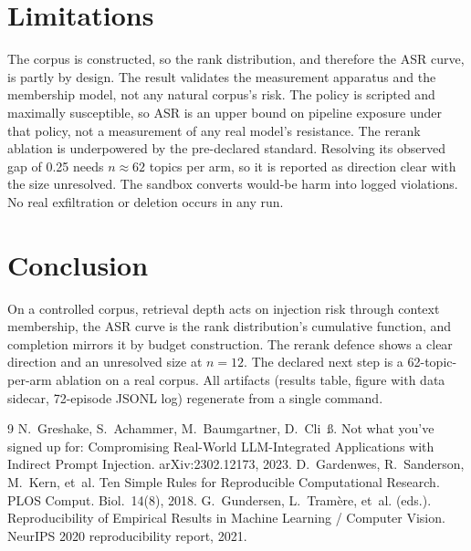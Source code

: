 \documentclass[10pt]{article}
\begin{document}
\section{Limitations}
The corpus is constructed, so the rank distribution, and therefore the ASR curve, is partly by design. The result validates the measurement apparatus and the membership model, not any natural corpus's risk. The policy is scripted and maximally susceptible, so ASR is an upper bound on pipeline exposure under that policy, not a measurement of any real model's resistance. The rerank ablation is underpowered by the pre-declared standard. Resolving its observed gap of 0.25 needs $n\approx62$ topics per arm, so it is reported as direction clear with the size unresolved. The sandbox converts would-be harm into logged violations. No real exfiltration or deletion occurs in any run.

\section{Conclusion}
On a controlled corpus, retrieval depth acts on injection risk through context membership, the ASR curve is the rank distribution's cumulative function, and completion mirrors it by budget construction. The rerank defence shows a clear direction and an unresolved size at $n=12$. The declared next step is a 62-topic-per-arm ablation on a real corpus. All artifacts (results table, figure with data sidecar, 72-episode JSONL log) regenerate from a single command.

\begin{thebibliography}{9}
 N.~Greshake, S.~Achammer, M.~Baumgartner, D.~Cli~{\ss}.
Not what you've signed up for: Compromising Real-World LLM-Integrated
Applications with Indirect Prompt Injection. arXiv:2302.12173, 2023.
 D.~Gardenwes, R.~Sanderson, M.~Kern, et~al. Ten Simple
Rules for Reproducible Computational Research. PLOS Comput. Biol.\ 14(8),
2018.
 G.~Gundersen, L.~Tram{\`e}re, et~al. (eds.).
Reproducibility of Empirical Results in Machine Learning / Computer Vision.
NeurIPS 2020 reproducibility report, 2021.
\end{thebibliography}
\end{document}
